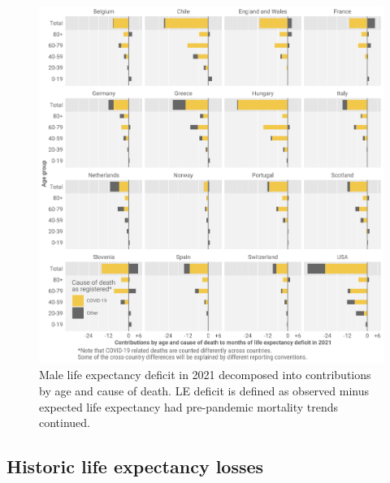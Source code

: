 \documentclass[12pt]{article}
\begin{document}
\begin{figure}[ht!]
    \centering
    \includegraphics{figure-a7.pdf}
    \caption{Male life expectancy deficit in 2021 decomposed into contributions by age and cause of death. LE deficit is defined as observed minus expected life expectancy had pre-pandemic mortality trends continued.}
    \label{fig:figure-a7}
\end{figure}

\clearpage

\subsection*{Historic life expectancy losses}
\end{document}

